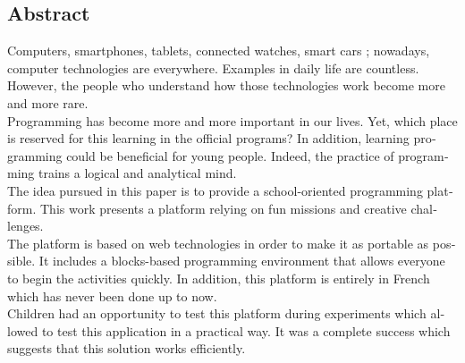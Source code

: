 \begin{otherlanguage}{english}
\section*{Abstract}
Computers, smartphones, tablets, connected watches, smart cars ; nowadays, computer technologies are everywhere. Examples in daily life are countless. However, the people who understand how those technologies work become more and more rare. \\

Programming has become more and more important in our lives. Yet, which place is reserved for this learning in the official programs? In addition, learning programming could be beneficial for young people. Indeed, the practice of programming trains a logical and analytical mind. \\

The idea pursued in this paper is to provide a school-oriented programming platform. This work presents a platform relying on fun missions and creative challenges. \\

The platform is based on web technologies in order to make it as portable as possible. It includes a blocks-based programming environment that allows everyone to begin the activities quickly. In addition, this platform is entirely in French which has never been done up to now. \\

Children had an opportunity to test this platform during experiments which allowed to test this application in a practical way. It was a complete success which suggests that this solution works efficiently.
\end{otherlanguage}
